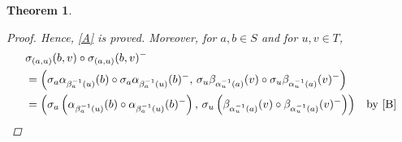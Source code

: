 \documentclass[preprint,1p]{elsarticle}
\newtheorem{theor}{Theorem}[section]
\theoremstyle{definition}               %
\begin{document}
\begin{theor}
\begin{proof}
   Hence, \eqref{A} is proved.           
Moreover, for $a,b \in S$ and for $u,v \in T$,
\begin{align*}
   & \sigma_{(a,u)}(b, v) \circ \sigma_{(a,u)}(b, v)^-\\
   &=\left( \sigma_a\alpha_{\beta^{-1}_a(u)}(b) \circ \sigma_a\alpha_{\beta^{-1}_a(u)}(b)^-, \, \sigma_u\beta_{\alpha^{-1}_u(a)}(v) \circ \sigma_u\beta_{\alpha^{-1}_u(a)}(v)^-\right)    \\
  &=\left( \sigma_a\left(\alpha_{\beta^{-1}_a(u)}(b)  \circ \alpha_{\beta^{-1}_a(u)}(b) ^-\right) , \, \sigma_u\left(\beta_{\alpha^{-1}_u(a)}(v) \circ \beta_{\alpha^{-1}_u(a)}(v)^-\right)\right) &\mbox{by \eqref{B}}\\

\end{align*}
\end{proof}
\end{theor}
\end{document}
